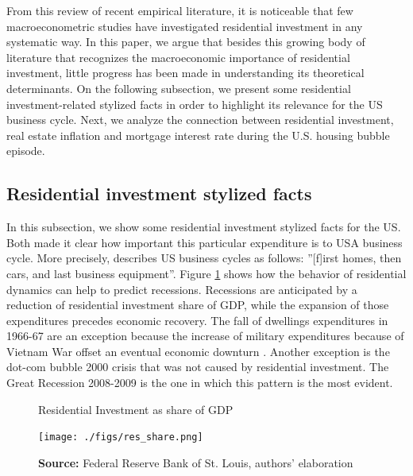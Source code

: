 \documentclass[11pt]{article}
\begin{document}
From this review of recent empirical literature, it is noticeable that few macroeconometric studies have investigated residential investment in any systematic way.
In this paper, we argue that besides this growing body of literature that recognizes the macroeconomic importance of residential investment, little progress has been made in understanding its theoretical determinants.
On the following subsection, we present some residential investment-related stylized facts in order to highlight its relevance for the US business cycle.
Next, we analyze the connection between residential investment, real estate inflation and mortgage interest rate during the U.S. housing bubble episode.
\subsection{Residential investment stylized facts}
\label{sec:orgea04b33}

In this subsection, we show some residential investment stylized facts for the US.
Both \cites{green_follow_1997}{leamer_housing_2007} made it clear how important this particular expenditure is to USA business cycle.
More precisely,  \textcite[p.~8]{leamer_housing_2007} describes US business cycles as follows: ''[f]irst homes, then cars,
and last business equipment''.
Figure \ref{Investo_Resid_GDP} shows how the behavior of residential dynamics can help to predict recessions. Recessions are anticipated by a reduction of residential investment share of GDP, while the expansion of those expenditures precedes economic recovery. The fall of dwellings expenditures in 1966-67 are an exception because the increase of military expenditures because of Vietnam War offset an eventual economic downturn \cite[p.~20]{leamer_housing_2007}. Another exception is the dot-com bubble 2000 crisis that was not caused by residential investment. The Great Recession 2008-2009 is the one in which this pattern is the most evident. 



\begin{figure}[htb]
    \centering
        \caption{Residential Investment as share of GDP}
        \label{Investo_Resid_GDP}
    \texttt{[image: ./figs/res\_share.png]}
    \caption*{\textbf{Source:} Federal Reserve Bank of St. Louis, authors’ elaboration}
\end{figure}
\end{document}
